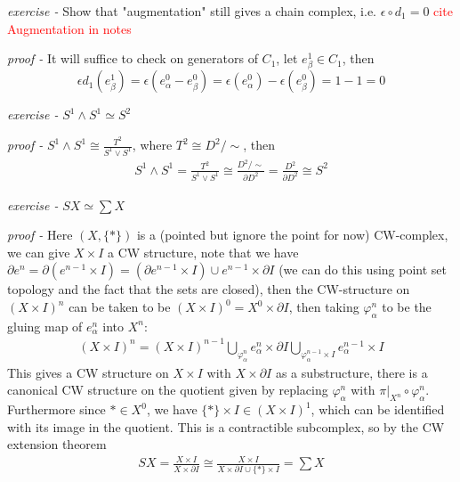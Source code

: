 \documentclass[11pt]{article}
\theoremstyle{definition}
\newcommand{\set}[1]{\{#1\}}
\begin{document}
    \emph{exercise - }\label{HEx6} Show that "augmentation" still gives a chain complex, i.e. \(\epsilon\circ d_1 = 0\) \textcolor{red}{cite Augmentation in notes}

    \emph{proof - } It will suffice to check on generators of \(C_1\), let \(e^1_\beta \in C_1\), then 
    \[\epsilon d_1(e^1_\beta) = \epsilon (e_\alpha^0 - e_{\beta}^0) = \epsilon(e_\alpha^0) - \epsilon(e_\beta^0) = 1-1 = 0\]


    \emph{exercise - }\label{HEx7} \(S^1 \wedge S^1 \simeq S^2\)

    \emph{proof - } \(S^1 \wedge S^1 \cong \frac{T^2}{S^1 \vee S^1}\), where \(T^2 \cong D^2/\sim\), then
    \begin{align*}
        S^1 \wedge S^1 = \frac{T^2}{S^1 \vee S^1} \cong \frac{D^2/\sim}{\partial D^2} = \frac{D^2}{\partial D^2} \cong S^2
    \end{align*}


    \emph{exercise - }\label{HEx8} \(SX \simeq \sum X\)

    \emph{proof - } Here \((X,\set{*})\) is a (pointed but ignore the point for now) CW-complex, we can give \(X \times I\) a CW structure, note that we have \(\partial e^n = \partial(e^{n-1} \times I) = (\partial e^{n-1} \times I)\cup e^{n-1} \times \partial I\)
    (we can do this using point set topology and the fact that the sets are closed), then the CW-structure on \((X \times I)^n\) can be taken to be \((X \times I)^0 = X^0 \times \partial I\), then taking \(\varphi_\alpha^n\) to be the gluing map of \(e_\alpha^{n}\) into \(X^n\):
    \begin{align*}
        (X \times I)^n = (X \times I)^{n-1} \bigcup_{\varphi_\alpha^n} e_\alpha^n \times \partial I \bigcup_{\varphi_\alpha^{n-1} \times I} e_\alpha^{n-1} \times I
    \end{align*}
    This gives a CW structure on \(X \times I\) with \(X \times \partial I\) as a substructure, there is a canonical CW structure on the quotient given by replacing \(\varphi_\alpha^n\) with \(\pi\vert_{X^n} \circ\varphi_\alpha^n\). Furthermore since \(* \in X^0\), we have \(\set{*} \times I \in (X \times I)^1\), which can be identified with its image in the quotient. This is a contractible subcomplex, so by the CW extension theorem
    \begin{align*}
        SX = \frac{X \times I}{X \times \partial I} \cong \frac{X \times I}{X \times \partial I \cup \set{*} \times I} = \sum X
    \end{align*}
    
\end{document}
